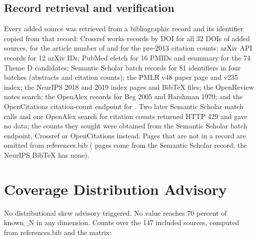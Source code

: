 \documentclass[journal,onecolumn]{IEEEtran}
\begin{document}
\subsection{Record retrieval and verification}

Every added source was retrieved from a bibliographic record and its identifier copied from that record: Crossref works records by DOI for all 32 DOIs of added sources, for the article number of \cite{ShifatERabbi2025Linear} and for the pre-2013 citation counts; arXiv API records for 12 arXiv IDs; PubMed efetch for 16 PMIDs and esummary for the 74 Theme D candidates; Semantic Scholar batch records for 81 identifiers in four batches (abstracts and citation counts); the PMLR v48 paper page and v235 index; the NeurIPS 2018 and 2019 index pages and BibTeX files; the OpenReview notes search; the OpenAlex records for Beg 2005 and Harshman 1970; and the OpenCitations citation-count endpoint for \cite{Bro1996Multiway}. Two later Semantic Scholar match calls and one OpenAlex search for citation counts returned HTTP 429 and gave no data; the counts they sought were obtained from the Semantic Scholar batch endpoint, Crossref or OpenCitations instead. Pages that are not in a record are omitted from references.bib (\cite{Luise2018Differential} pages come from the Semantic Scholar record; the NeurIPS BibTeX has none).

\section{Coverage Distribution Advisory}

No distributional skew advisory triggered. No value reaches 70 percent of known\_N in any dimension. Counts over the 147 included sources, computed from references.bib and the matrix:
\end{document}
